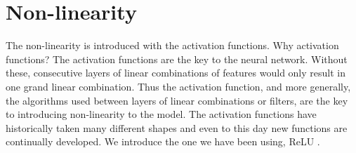 \section{Non-linearity}
\label{sec:nonlinear}
The non-linearity is introduced with the activation functions.
Why activation functions?
The activation functions are the key to the neural network. 
Without these, consecutive layers of linear combinations of features would only result in one grand linear combination. 
Thus the activation function, and more generally, the algorithms used between layers of linear combinations or filters, are the key to introducing non-linearity to the model. 
The activation functions have historically taken many different shapes and even to this day new functions are continually developed. 
We introduce the one we have been using, \ac{ReLU} \cite{nairRectifiedLinearUnits}.
